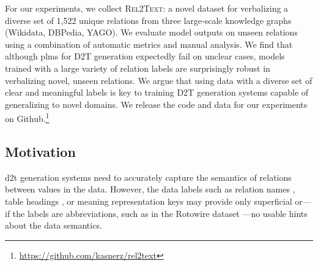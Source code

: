 For our experiments, we collect \textsc{Rel2Text}: a novel dataset for verbalizing a diverse set of 1,522 unique relations from three large-scale knowledge graphs (Wikidata, DBPedia, YAGO). We evaluate model outputs on unseen relations using a combination of automatic metrics and manual analysis. We find that although \acp{plm} for D2T generation expectedly fail on unclear cases, models trained with a large variety of relation labels are surprisingly robust in verbalizing novel, unseen relations. We argue that using data with a diverse set of clear and meaningful labels is key to training D2T generation systems capable of generalizing to novel domains. We release the code and data for our experiments on Github.\footnote{\url{https://github.com/kasnerz/rel2text}}


% 

\subsection{Motivation}
\ac{d2t} generation systems need to accurately capture the semantics of relations between values in the data. However, the data labels such as relation names \cite{farber2018linked,haller2022analysis}, table headings \cite{parikhToTToControlledTableToText2020}, or meaning representation keys \cite{dusekEvaluatingStateoftheartEndtoEnd2020} may provide only superficial or---if the labels are abbreviations, such as in the Rotowire dataset \cite{wiseman2017challenges}---no usable hints about the data semantics.



